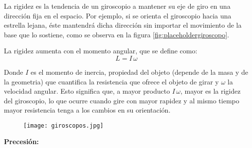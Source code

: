     La rigidez es la tendencia de un giroscopio a mantener su eje de giro en una dirección fija en el espacio. Por ejemplo, si se orienta el giroscopio hacia una estrella lejana, éste mantendrá dicha dirección sin importar el movimiento de la base que lo sostiene, como se observa en la figura \ref{fig:placeholdergiroscopo}.\\
    
\begin{definicion}
 La rigidez aumenta con el momento angular, que se define como:
\begin{equation}
    L = I\,\omega
\end{equation}
\end{definicion}

    Donde \(I\) es el momento de inercia, propiedad del objeto (depende de la masa y de la geometria) que cuantifica la resistencia que ofrece el objeto de girar y \(\omega\) la velocidad angular. Esto significa que, a mayor producto \(I\,\omega\), mayor es la rigidez del giroscopio, lo que ocurre cuando gire con mayor rapidez y al mismo tiempo mayor resistencia tenga a los cambios en su orientación.\\

\begin{figure}[H]
    \centering
    \begin{minipage}{0.3\textwidth} 
        \centering
        \texttt{[image: giroscopos.jpg]}
    \end{minipage}%
    \hfill
    \begin{minipage}{0.6 \textwidth} %
    \end{minipage}
\end{figure}



\begin{nosangria}
\large{\textbf{ Precesión:}}
\end{nosangria}



